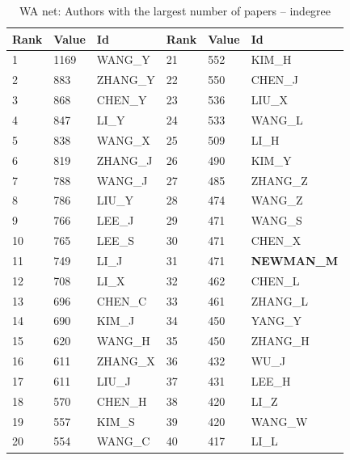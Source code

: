 \documentclass[11pt]{article} %
\begin{document}
\begin{table}
\caption{WA net: \label{numpap} Authors with the largest number of papers -- indegree}
\renewcommand{\arraystretch}{0.9}
\begin{center}
\begin{tabular}{l|l|l||l|l|l}
Rank& 	Value& 	Id& 	Rank& 	Value& 	Id\\  \hline   
1& 	1169& 	WANG\_Y& 	21& 	552& 	KIM\_H\\ 
2& 	883& 	ZHANG\_Y& 	22& 	550& 	CHEN\_J\\ 
3& 	868& 	CHEN\_Y& 	23& 	536& 	LIU\_X\\ 
4& 	847& 	LI\_Y& 	24& 	533& 	WANG\_L\\ 
5& 	838& 	WANG\_X& 	25& 	509& 	LI\_H\\ 
6& 	819& 	ZHANG\_J& 	26& 	490& 	KIM\_Y\\ 
7& 	788& 	WANG\_J& 	27& 	485& 	ZHANG\_Z\\ 
8& 	786& 	LIU\_Y& 	28& 	474& 	WANG\_Z\\ 
9& 	766& 	LEE\_J& 	29& 	471& 	WANG\_S\\ 
10& 	765& 	LEE\_S& 	30& 	471& 	CHEN\_X\\ 
11& 	749& 	LI\_J& 	31& 	471& 	\textbf{NEWMAN\_M}\\ 
12& 	708& 	LI\_X& 	32& 	462& 	CHEN\_L\\ 
13& 	696& 	CHEN\_C& 	33& 	461& 	ZHANG\_L\\ 
14& 	690& 	KIM\_J& 	34& 	450& 	YANG\_Y\\ 
15& 	620& 	WANG\_H& 	35& 	450& 	ZHANG\_H\\ 
16& 	611& 	ZHANG\_X& 	36& 	432& 	WU\_J\\ 
17& 	611& 	LIU\_J& 	37& 	431& 	LEE\_H\\ 
18& 	570& 	CHEN\_H& 	38& 	420& 	LI\_Z\\ 
19& 	557& 	KIM\_S& 	39& 	420& 	WANG\_W\\ 
20& 	554& 	WANG\_C& 	40& 	417& 	LI\_L\\ \hline  
\end{tabular}
\end{center}
\end{table}
\end{document}
